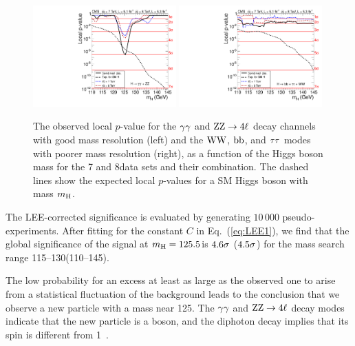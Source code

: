 \documentclass[12pt,twoside,a4paper,cmspaper,final,collab]{cms-tdr}
\begin{document}
\begin{figure} %
\centering
\includegraphics[width=0.49\textwidth]{figures/comb/sqr_pvala_all_energy_hires} \hfill
\includegraphics[width=0.49\textwidth]{figures/comb/sqr_pvala_all_energy_lowres}
\caption{
The observed local $p$-value for the $\gamma\gamma$ and $\mathrm{Z}\mathrm{Z} \to 4\ell$ decay channels with good  mass resolution (left)
and the  $\mathrm{W}\mathrm{W}$, $\mathrm{b}\mathrm{b}$, and $\tau\tau$ modes with poorer mass resolution (right), as a function of the
Higgs boson mass for the 7 and 8\TeV data sets and their combination.
The dashed lines show the expected local $p$-values for
a SM Higgs boson with  mass $m_{\mathrm{H}}$.
    }
\label{fig:pvalue_subcomb}
\end{figure}


The LEE-corrected significance
is evaluated by generating $10\,000$ pseudo-experiments.  After fitting for
the constant $C$ in Eq.~(\ref{eq:LEE1}),
we find that the global significance of the signal at $m_{\mathrm{H}}=125.5$\GeV is
$4.6 \sigma$ ($4.5 \sigma$) for the mass search
range 115--130\GeV (110--145\GeV).

The low probability for an excess at least as large as the observed one
to arise from a statistical fluctuation of the background leads  to the conclusion that
we observe a new particle with a mass near 125\GeV.
The  $\gamma\gamma$ and $\mathrm{Z}\mathrm{Z} \to 4\ell$ decay modes indicate that the new particle is a boson, and
the diphoton decay implies that its spin is different from 1~\cite{Landau,Yang}.
\end{document}
